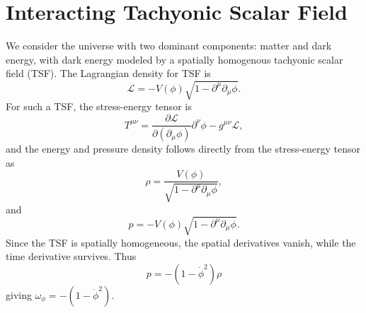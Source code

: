 \documentclass[preprint,aps,floatfix]{revtex4}
\begin{document}
    \section{Interacting Tachyonic Scalar Field}\label{ITSF}
\noindent 
    We consider the universe with two dominant components: matter and dark energy, with dark energy modeled by a spatially homogenous tachyonic scalar field (TSF). The Lagrangian density for TSF is \cite{Sen_2002,Sen1_2002}
%
    \begin{equation}
        \mathcal{L} = -V(\phi) \sqrt{1 - \partial^\mu \partial_\mu \phi}.
    \end{equation}
    For such a TSF, the stress-energy tensor is
    \begin{equation}
        T^{\mu\nu} = \frac{\partial \mathcal{L}}{\partial (\partial_{\mu}\phi) }\partial^{\nu}\phi - g^{\mu\nu}\mathcal{L},
    \end{equation}
    and the energy and pressure density follows directly from the stress-energy tensor as
    \begin{equation}
        \rho = \frac{V(\phi)}{\sqrt{1 - \partial^\mu \partial_\mu \phi}},
    \end{equation}
    and
    \begin{equation}
        p = -V(\phi)\sqrt{1- \partial^\mu \partial_\mu \phi}.
    \end{equation}
    Since the TSF is spatially homogeneous, the spatial derivatives vanish, while the time derivative survives. Thus
    \begin{equation}
        p = - (1 - \dot{\phi}^2)\rho
    \end{equation}
    giving $\omega_\phi = -(1-\dot{\phi}^2)$.\\
%
    \renewcommand{\thefootnote}{\fnsymbol{footnote}}
    \setcounter{footnote}{0}
\end{document}
